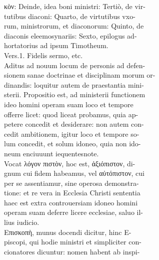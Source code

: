 \documentclass{article}
\begin{document}
\begin{pages}
                κὸν: Deinde, idea boni ministri: Tertiò, de vir- \\
                tutibus diaconi: Quarto, de virtutibus vxo- \\
                rum, ministrorum, et diaconorum: Quinto, de \\
                diaconis eleemosynariis: Sexto, epilogus ad- \\
                hortatorius ad ipsum Timotheum. \\
                Vers.1. Fidelis sermo, etc. \\
                Aditus ad nouum locum de personis ad defen- \\
                sionem sanae doctrinae et disciplinam morum or- \\
                dinandis: loquitur autem de praestantia mini- \\
                sterii. Propositio est, ad ministerii functionem \\
                ideo homini operam suam loco et tempore \\
                offerre licet: quod liceat probamus, quia ap- \\
                petere concedit et desiderare: non autem con- \\
                cedit ambitionem, igitur loco et tempore so- \\
                lum concedit, et solum idoneo, quia non ido- \\
                neum enciuuunt iequentesnote. \\
                Vocat λόγον πιστὸν, hoc est, ἀξιόπιστον, di- \\
                gnum cui fidem habeamus, vel αὐτόπιστον, cui \\
                per se assentiamur, sine operosa demonstra- \\
                tione: et re vera in Ecclesia Christi sententia \\
                haec est extra controuersiam idoneo homini \\
                operam suam deferre licere ecclesiae, saluo il- \\
                lius iudicio. \\
                Επισκοπὴ, munus docendi dicitur, hinc E- \\
                piscopi, qui hodie ministri et simpliciter con- \\
                cionatores dicuntur: nomen habent ab inspi- \\

\end{pages}
\end{document}
